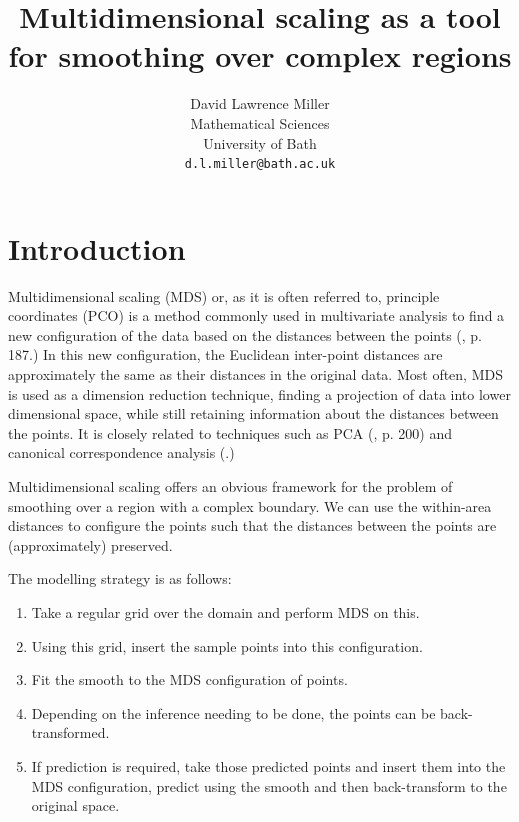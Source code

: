 \documentclass[a4paper,10pt]{article}
\title{Multidimensional scaling as a tool for smoothing over complex regions}
\author{David Lawrence Miller\\Mathematical Sciences\\University of Bath\\\texttt{d.l.miller@bath.ac.uk}}
\begin{document}
 
 
 
\newtheorem{thm}{Theorem}[section]
 
\newtheorem{defn}{Definition}[section]
 
\maketitle


\section{Introduction}

Multidimensional scaling (MDS) or, as it is often referred to, principle coordinates (PCO) is a method commonly used in multivariate analysis to find a new configuration of the data based on the distances between the points (\cite{chatfieldcollins}, p. 187.) In this new configuration, the Euclidean inter-point distances are approximately the same as their distances in the original data. Most often, MDS is used as a dimension reduction technique, finding a projection of data into lower dimensional space, while still retaining information about the distances between the points. It is closely related to techniques such as PCA (\cite{chatfieldcollins}, p. 200) and canonical correspondence analysis (\cite{terbraak}.)

Multidimensional scaling offers an obvious framework for the problem of smoothing over a region with a complex boundary. We can use the within-area distances to configure the points such that the distances between the points are (approximately) preserved.

The modelling strategy is as follows:

\begin{enumerate}
\item Take a regular grid over the domain and perform MDS on this.
\item Using this grid, insert the sample points into this configuration.
\item Fit the smooth to the MDS configuration of points.
\item Depending on the inference needing to be done, the points can be back-transformed.
\item If prediction is required, take those predicted points and insert them into the MDS configuration, predict using the smooth and then back-transform to the original space.
\end{enumerate}
\end{document}
